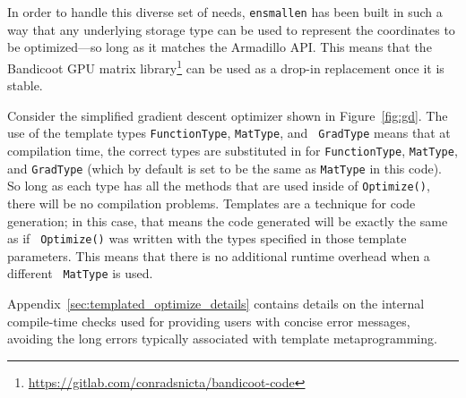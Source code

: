 In order to handle this diverse set of needs, {\tt ensmallen} has been built in
such a way that any underlying storage type can be used to represent the
coordinates to be optimized---so long as it matches the Armadillo API.
This means that the Bandicoot GPU matrix library\footnote{\url{https://gitlab.com/conradsnicta/bandicoot-code}}
can be used as a drop-in replacement once it is stable.

Consider the simplified gradient descent optimizer shown in Figure~\ref{fig:gd}.
The use of the template types {\tt FunctionType}, {\tt MatType}, and {\tt
GradType} means that at compilation time, the correct types are substituted in
for {\tt FunctionType}, {\tt MatType}, and {\tt GradType} (which by default is
set to be the same as {\tt MatType} in this code).  So long as each type has all
the methods that are used inside of {\tt Optimize()}, there will be no
compilation problems.  Templates are a technique for code generation; in this
case, that means the code generated will be exactly the same as if {\tt
Optimize()} was written with the types specified in those template parameters.
This means that there is no additional runtime overhead when a different {\tt
MatType} is used.

Appendix~\ref{sec:templated_optimize_details} contains details on the internal
compile-time checks used for providing users with concise error messages, 
avoiding the long errors typically associated with template metaprogramming.
